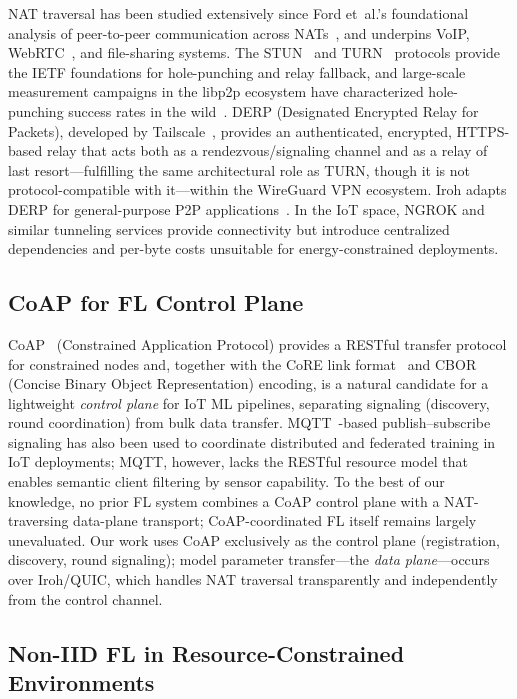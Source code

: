 \documentclass[a4paper,fleqn]{cas-dc}
\begin{document}
NAT traversal has been studied extensively since Ford et~al.'s foundational analysis of peer-to-peer communication across NATs~\cite{ford2005,rfc5128}, and underpins VoIP, WebRTC~\cite{webrtc2021}, and file-sharing systems. The STUN~\cite{rfc8489} and TURN~\cite{rfc8656} protocols provide the IETF foundations for hole-punching and relay fallback, and large-scale measurement campaigns in the libp2p ecosystem have characterized hole-punching success rates in the wild~\cite{seemann2022}. DERP (Designated Encrypted Relay for Packets), developed by Tailscale~\cite{tailscale2023}, provides an authenticated, encrypted, HTTPS-based relay that acts both as a rendezvous/signaling channel and as a relay of last resort---fulfilling the same architectural role as TURN, though it is not protocol-compatible with it---within the WireGuard VPN ecosystem. Iroh adapts DERP for general-purpose P2P applications~\cite{iroh2024}. In the IoT space, NGROK and similar tunneling services provide connectivity but introduce centralized dependencies and per-byte costs unsuitable for energy-constrained deployments.

\subsection{CoAP for FL Control Plane}

CoAP~\cite{rfc7252} (Constrained Application Protocol) provides a RESTful transfer protocol for constrained nodes and, together with the CoRE link format~\cite{rfc6690} and CBOR~\cite{rfc8949} (Concise Binary Object Representation) encoding, is a natural candidate for a lightweight \emph{control plane} for IoT ML pipelines, separating signaling (discovery, round coordination) from bulk data transfer. MQTT~\cite{mqtt2019}-based publish--subscribe signaling has also been used to coordinate distributed and federated training in IoT deployments; MQTT, however, lacks the RESTful resource model that enables semantic client filtering by sensor capability. To the best of our knowledge, no prior FL system combines a CoAP control plane with a NAT-traversing data-plane transport; CoAP-coordinated FL itself remains largely unevaluated. Our work uses CoAP exclusively as the control plane (registration, discovery, round signaling); model parameter transfer---the \emph{data plane}---occurs over Iroh/QUIC, which handles NAT traversal transparently and independently from the control channel.

\subsection{Non-IID FL in Resource-Constrained Environments}
\end{document}
